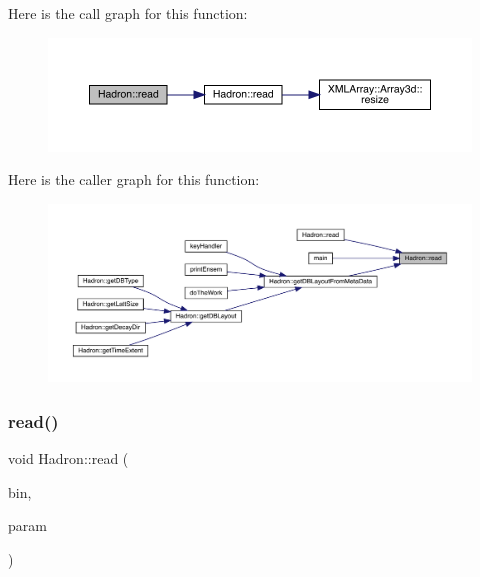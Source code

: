 Here is the call graph for this function\+:
\nopagebreak
\begin{figure}[H]
\begin{center}
\leavevmode
\includegraphics[width=350pt]{d1/daf/namespaceHadron_a61520b9a5ce2b207d1c01e1508a5c470_cgraph}
\end{center}
\end{figure}
Here is the caller graph for this function\+:
\nopagebreak
\begin{figure}[H]
\begin{center}
\leavevmode
\includegraphics[width=350pt]{d1/daf/namespaceHadron_a61520b9a5ce2b207d1c01e1508a5c470_icgraph}
\end{center}
\end{figure}
\mbox{\label{namespaceHadron_ac7fbe05fdb59de181eed9428364667e3}} 
\subsubsection{\texorpdfstring{read()}{read()}\hspace{0.1cm}{\footnotesize\ttfamily [24/94]}}
{\footnotesize\ttfamily void Hadron\+::read (\begin{DoxyParamCaption}\item[{\mbox{\hyperlink{classADATIO_1_1BinaryReader}{Binary\+Reader}} \&}]{bin,  }\item[{\mbox{\hyperlink{structHadron_1_1KeyPropElementalOperator__t}{Key\+Prop\+Elemental\+Operator\+\_\+t}} \&}]{param }\end{DoxyParamCaption})}



